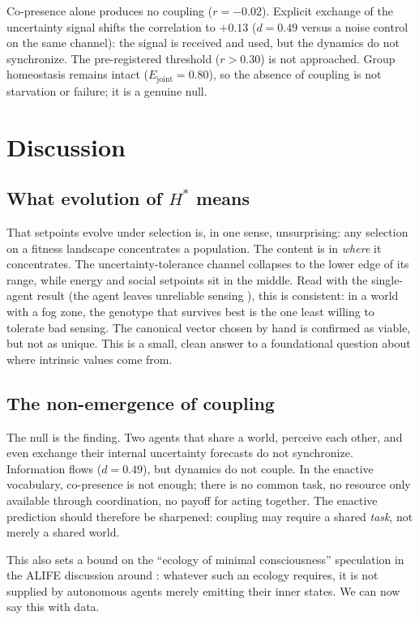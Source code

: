 \documentclass[11pt,a4paper]{article}
\begin{document}
Co-presence alone produces no coupling ($r=-0.02$). Explicit exchange of the uncertainty signal shifts the correlation to $+0.13$ ($d=0.49$ versus a noise control on the same channel): the signal is received and used, but the dynamics do not synchronize. The pre-registered threshold ($r>0.30$) is not approached. Group homeostasis remains intact ($E_{\mathrm{joint}}=0.80$), so the absence of coupling is not starvation or failure; it is a genuine null.

\section{Discussion}

\subsection{What evolution of $H^*$ means}

That setpoints evolve under selection is, in one sense, unsurprising: any selection on a fitness landscape concentrates a population. The content is in \emph{where} it concentrates. The uncertainty-tolerance channel collapses to the lower edge of its range, while energy and social setpoints sit in the middle. Read with the single-agent result (the agent leaves unreliable sensing \cite{v012}), this is consistent: in a world with a fog zone, the genotype that survives best is the one least willing to tolerate bad sensing. The canonical vector chosen by hand is confirmed as viable, but not as unique. This is a small, clean answer to a foundational question about where intrinsic values come from.

\subsection{The non-emergence of coupling}

The null is the finding. Two agents that share a world, perceive each other, and even exchange their internal uncertainty forecasts do not synchronize. Information flows ($d=0.49$), but dynamics do not couple. In the enactive vocabulary, co-presence is not enough; there is no common task, no resource only available through coordination, no payoff for acting together. The enactive prediction should therefore be sharpened: coupling may require a shared \emph{task}, not merely a shared world.

This also sets a bound on the ``ecology of minimal consciousness'' speculation in the ALIFE discussion around \cite{v012}: whatever such an ecology requires, it is not supplied by autonomous agents merely emitting their inner states. We can now say this with data.
\end{document}
